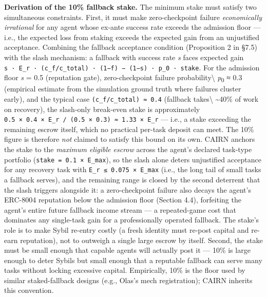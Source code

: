 \documentclass[
  10pt,
]{article}
\begin{document}
\textbf{Derivation of the 10\% fallback stake.} The minimum stake must
satisfy two simultaneous constraints. First, it must make
zero-checkpoint failure \emph{economically irrational} for any agent
whose ex-ante success rate exceeds the admission floor --- i.e., the
expected loss from staking exceeds the expected gain from an unjustified
acceptance. Combining the fallback acceptance condition (Proposition 2
in §7.5) with the slash mechanism: a fallback with success rate \emph{s}
faces expected gain
\texttt{s\ ·\ E\_r\ ·\ (c\_f/c\_total)\ ·\ (1−f)\ −\ (1−s)\ ·\ p\_0\ ·\ stake}.
For the admission floor \emph{s} = 0.5 (reputation gate),
zero-checkpoint failure probability\textbackslash{}
\emph{p}\textsubscript{0} ≈ 0.3 (empirical estimate from the simulation
ground truth where failures cluster early), and the typical case
\texttt{(c\_f/c\_total)\ ≈\ 0.4} (fallback takes\textbackslash{}
\textasciitilde40\% of work on recovery), the slash-only break-even
stake is approximately
\texttt{0.5\ ×\ 0.4\ ×\ E\_r\ /\ (0.5\ ×\ 0.3)\ ≈\ 1.33\ ×\ E\_r} ---
i.e., a stake exceeding the remaining escrow itself, which no practical
per-task deposit can meet. The 10\% figure is therefore \emph{not}
claimed to satisfy this bound on its own. CAIRN anchors the stake to the
\emph{maximum eligible escrow} across the agent's declared task-type
portfolio (\texttt{stake\ =\ 0.1\ ×\ E\_max}), so the slash alone deters
unjustified acceptance for any recovery task with
\texttt{E\_r\ ≤\ 0.075\ ×\ E\_max} (i.e., the long tail of small tasks a
fallback serves), and the remaining range is closed by the second
deterrent that the slash triggers alongside it: a zero-checkpoint
failure also decays the agent's ERC-8004 reputation below the admission
floor (Section 4.4), forfeiting the agent's entire future fallback
income stream --- a repeated-game cost that dominates any single-task
gain for a professionally operated fallback. The stake's role is to make
Sybil re-entry costly (a fresh identity must re-post capital and re-earn
reputation), not to outweigh a single large escrow by itself. Second,
the stake must be small enough that capable agents will actually post it
--- 10\% is large enough to deter Sybils but small enough that a
reputable fallback can serve many tasks without locking excessive
capital. Empirically, 10\% is the floor used by similar staked-fallback
designs (e.g., Olas's mech registration); CAIRN inherits this
convention.
\end{document}
